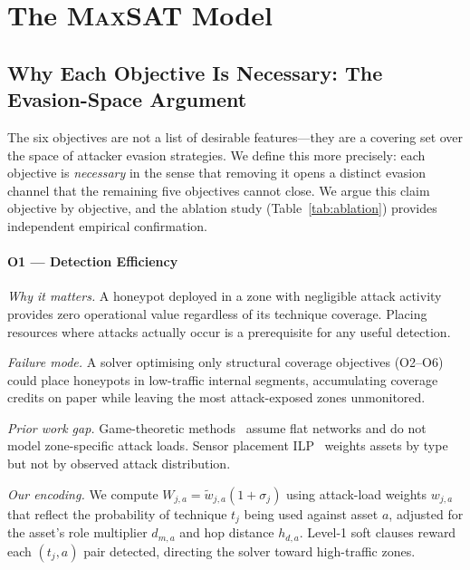 \documentclass[journal]{IEEEtran}
\newcommand{\MAXSAT}{\textsc{MaxSAT}}
\begin{document}
\section{The \MAXSAT{} Model}
\label{sec:model}

\subsection{Why Each Objective Is Necessary: The Evasion-Space Argument}
\label{sec:model:objectives}

The six objectives are not a list of desirable features---they
are a covering set over the space of attacker evasion strategies.
We define this more precisely: each objective is \emph{necessary}
in the sense that removing it opens a distinct evasion channel that
the remaining five objectives cannot close. We argue this claim
objective by objective, and the ablation study (Table~\ref{tab:ablation})
provides independent empirical confirmation.

\paragraph{O1 --- Detection Efficiency}
\textit{Why it matters.}
A honeypot deployed in a zone with negligible attack activity provides
zero operational value regardless of its technique coverage. Placing
resources where attacks actually occur is a prerequisite for any
useful detection.

\textit{Failure mode.}
A solver optimising only structural coverage objectives (O2--O6)
could place honeypots in low-traffic internal segments, accumulating
coverage credits on paper while leaving the most attack-exposed
zones unmonitored.

\textit{Prior work gap.}
Game-theoretic methods~\cite{kiekintveld2015,pawlick2019} assume flat
networks and do not model zone-specific attack loads. Sensor placement
ILP~\cite{saha2015} weights assets by type but not by observed attack
distribution.

\textit{Our encoding.}
We compute $W_{j,a}=\tilde{w}_{j,a}(1+\sigma_j)$ using attack-load
weights $w_{j,a}$ that reflect the probability of technique $t_j$
being used against asset $a$, adjusted for the asset's role
multiplier $d_{m,a}$ and hop distance $h_{d,a}$. Level-1 soft clauses
reward each $(t_j,a)$ pair detected, directing the solver toward
high-traffic zones.
\end{document}
